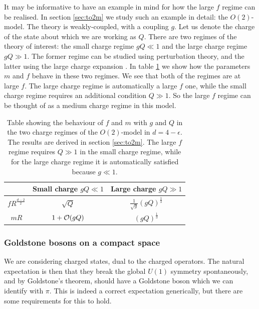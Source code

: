\documentclass[11pt]{article}
\numberwithin{equation}{section}
\begin{document}
It may be informative to have an example in mind for how the large $f$ regime can be realised. In section \ref{sec:to2m} we study such an example in detail: the $O(2)$-model. The theory is weakly-coupled, with a coupling $g$. Let us denote the charge of the state about which we are working as $Q$. There are two regimes of the theory of interest: the small charge regime $g Q \ll 1$ and the large charge regime $gQ \gg 1$. The former regime can be studied using perturbation theory, and the latter using the large charge expansion \cite{Hellerman:2015nra}. In table \ref{tab:fmQso2} we show how the parameters $m$ and $f$ behave in these two regimes. We see that both of the regimes are at large $f$. The large charge regime is automatically a large $f$ one, while the small charge regime requires an additional condition $Q \gg 1$. So the large $f$ regime can be thought of as a medium charge regime in this model. 
\begin{table}
\center
\def\arraystretch{2}
\begin{tabular}{|c|c|c|}
\hline
 & Small charge $gQ \ll 1$ & Large charge $gQ \gg 1$ \\
\hline
$f R^{\frac{d-2}{2}}$ & $\sqrt{Q}$ & $\frac{1}{\sqrt{g}}\left(gQ\right)^{\frac13} $ \\
\hline	
$m R$ & $1 + {\cal O}(gQ)$ & $\left(gQ\right)^{\frac13}$ \\
\hline
\end{tabular}
\caption{Table showing the behaviour of $f$ and $m$ with $g$ and $Q$ in the two charge regimes of the $O(2)$-model in $d=4-\epsilon$. The results are derived in section \ref{sec:to2m}. The large $f$ regime requires $Q \gg 1$ in the small charge regime, while for the large charge regime it is automatically satisfied because $g \ll 1$.}
\label{tab:fmQso2}	
\end{table}


\subsubsection{Goldstone bosons on a compact space}
\label{sec:ssb}

We are considering charged states, dual to the charged operators. The natural expectation is then that they break the global $U(1)$ symmetry spontaneously, and by Goldstone's theorem, should have a Goldstone boson which we can identify with $\pi$. This is indeed a correct expectation generically, but there are some requirements for this to hold. 
\end{document}
